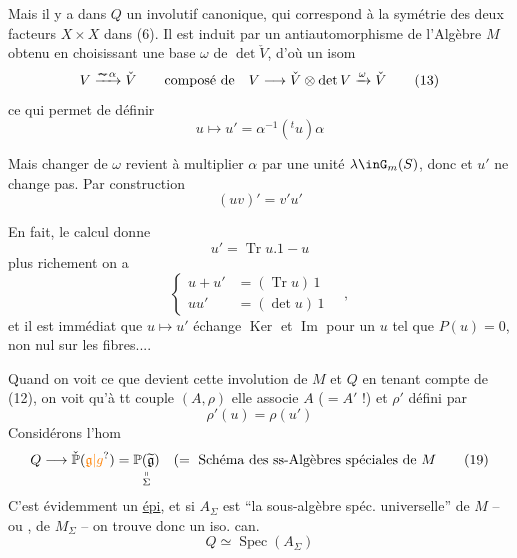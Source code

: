 Mais il y a dans $Q$ un  involutif canonique, qui correspond à la symétrie des deux facteurs $X\times X$ dans (6). Il est induit par un antiautomorphisme  de l'Algèbre $M$ obtenu  en choisissant  une \deleted{\unsure{$\omega$}} base $\omega$ de $\det\check V$, d'où un isom 
\[
 V\xrightarrow{\deleted{\sim}\,\alpha}\check V
 \qquad\text{composé de}\quad V\longrightarrow\check V\otimes\det V\xrightarrow{\omega}\check V
 \tag*{(13)}
\]
ce qui permet de définir
\[
 u\longmapsto u'=\alpha^{-1}({}^{t}u)\alpha\tag*{(14)}
\]

Mais changer de $\omega$ revient à multiplier $\alpha$ par une  unité $\lambda\inG_m(S)$, donc  et $u'$ ne change pas. Par construction
\[
 (uv)'=v'u' \tag*{(15)}
\]

En fait, le calcul donne
\[
 u'=\operatorname{Tr}u.1-u\tag*{(16)}
\]
plus richement on a
\[
 \left\{\begin{aligned}u+u'&=(\operatorname{Tr}u)\,1\\ uu'&=(\det u)\,1\end{aligned}\right. \quad,\tag*{(17)}
\]
et il est immédiat que $u\longmapsto u'$ échange $\operatorname{Ker}$ et $\operatorname{Im}$ pour un $u$ tel que $P(u)=0$,  non nul sur les fibres....

Quand on voit ce que devient cette involution de $M$ et $Q$ en tenant compte de (12), on voit qu'à tt couple $(A,\rho)$ elle associe $A$ ($=A'$ !) et $\rho'$ défini par
\[
 \rho'(u)=\rho(u')\tag*{(18)}
\]
Considérons l'hom
\[
 Q\longrightarrow\check{\mathbb P}(\unsure{\mathfrak g|g})
 =\underset{\substack{\shortparallel\\\Sigma}}{\mathbb P(\widetilde{\mathfrak g})}
 \quad(=\ \text{Schéma des ss-Algèbres spéciales de }M
 \tag*{(19)}
\]
C'est évidemment un \uline{épi}, et si $A_\Sigma$ est ``la sous-algèbre spéc. universelle'' de $M$ -- ou , de $M_\Sigma$ -- on trouve donc un iso. can.
\[
 Q\simeq\operatorname{Spec}(A_\Sigma)\tag*{(20)}
\]
\noindent\shortstack{\rule{1.7cm}{0.4pt}\\[-0.55em]\rule{1.7cm}{0.4pt}}

